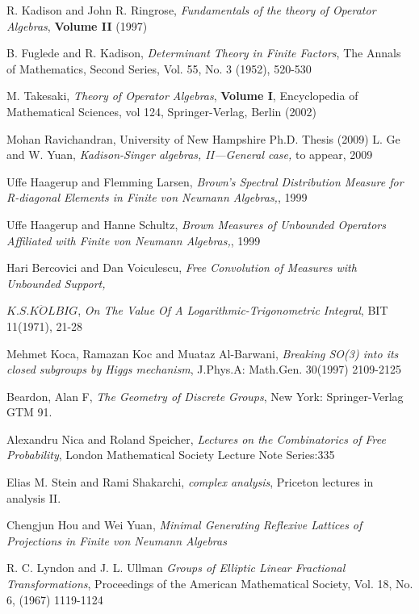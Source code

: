 \documentclass{amsart}
\begin{document}
\begin{thebibliography}{21}

 R. Kadison and John R. Ringrose, {\em Fundamentals of the theory of Operator Algebras},  {\bf Volume II } (1997)

 B. Fuglede and R. Kadison, {\em Determinant Theory in Finite Factors}, The Annals of Mathematics, Second Series, Vol. 55, No. 3 (1952), 520-530

 M. Takesaki, {\em Theory of Operator Algebras}, {\bf Volume I}, Encyclopedia of Mathematical Sciences, vol 124, Springer-Verlag, Berlin (2002)

 Mohan Ravichandran, {University of New Hampshire Ph.D. Thesis} (2009) 
 L. Ge and W. Yuan, {\em Kadison-Singer algebras,
II---General case,} to appear, 2009

 Uffe Haagerup and Flemming Larsen, {\em Brown's Spectral Distribution Measure for
R-diagonal Elements in Finite von Neumann Algebras,}, 1999

 Uffe Haagerup and Hanne Schultz, {\em Brown Measures of Unbounded Operators Affiliated with
 Finite von Neumann Algebras,}, 1999

 Hari Bercovici and Dan Voiculescu, {\em Free Convolution of Measures with Unbounded Support, }

 $K.S.K\ddot{O}LBIG$, {\em On The Value Of A Logarithmic-Trigonometric Integral}, BIT 11(1971), 21-28

 Mehmet Koca, Ramazan Koc and Muataz Al-Barwani, {\em Breaking SO(3) into its closed subgroups by Higgs mechanism},
J.Phys.A: Math.Gen. 30(1997) 2109-2125

 Beardon, Alan F, {\em The Geometry of Discrete Groups}, New York: Springer-Verlag GTM 91.

 Alexandru Nica and Roland Speicher, {\em Lectures on the Combinatorics of Free Probability},
London Mathematical Society Lecture Note Series:335

 Elias M. Stein and Rami Shakarchi, {\em complex analysis}, Priceton lectures in analysis II.

 Chengjun Hou and Wei Yuan, {\em Minimal Generating Reflexive Lattices of Projections in Finite von Neumann Algebras}

 R. C. Lyndon and J. L. Ullman {\em Groups of Elliptic Linear Fractional Transformations}, Proceedings of the American Mathematical Society,   Vol. 18, No. 6, (1967) 1119-1124


\end{thebibliography}
\end{document}

